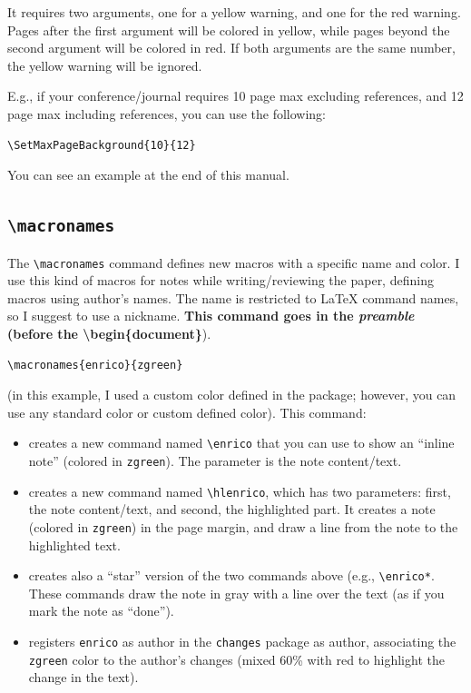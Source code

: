 \documentclass[a4paper]{article}
\newcommand\B[1]{\texttt{\textbackslash #1}}
\begin{document}
It requires two arguments, one for a yellow warning, and one for the red warning. Pages after the first argument will be colored in yellow, while pages beyond the second argument will be colored in red. If both arguments are the same number, the yellow warning will be ignored.

E.g., if your conference/journal requires 10 page max excluding references, and 12 page max including references, you can use the following:

\begin{verbatim}
\SetMaxPageBackground{10}{12}
\end{verbatim}

You can see an example at the end of this manual.

\subsection{\B{macronames}}

The \B{macronames} command defines new macros with a specific name and color. I use this kind of macros for notes while writing/reviewing the paper, defining macros using author's names. The name is restricted to LaTeX command names, so I suggest to use a nickname. \textbf{This command goes in the \textit{preamble} \\(before the \textbackslash begin\{document\}}).

\begin{verbatim}
\macronames{enrico}{zgreen}
\end{verbatim}

(in this example, I used a custom color defined in the package; however, you can use any standard color or custom defined color). This command:

\begin{itemize}
    \item creates a new command named \B{enrico} that you can use to show an ``inline note'' (colored in \texttt{zgreen}). The parameter is the note content/text.
    \item creates a new command named \B{hlenrico}, which has two parameters: first, the note content/text, and second, the highlighted part. It creates a note (colored in \texttt{zgreen}) in the page margin, and draw a line from the note to the highlighted text.
    \item creates also a ``star'' version of the two commands above (e.g., \B{enrico*}. These commands draw the note in gray with a line over the text (as if you mark the note as ``done'').
    \item registers \texttt{enrico} as author in the \texttt{changes} package as author, associating the \texttt{zgreen} color to the author's changes (mixed 60\% with red to highlight the change in the text).
\end{itemize}
\end{document}
